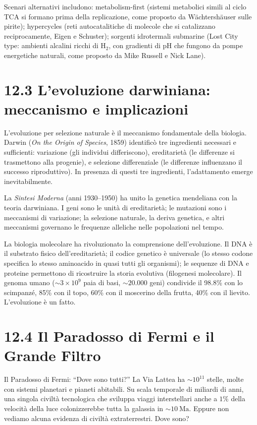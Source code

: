 \documentclass[11.5pt,a4paper,openany]{book}
\theoremstyle{remark}
\begin{document}
Scenari alternativi includono: metabolism-first (sistemi metabolici simili al ciclo TCA si formano prima della replicazione, come proposto da Wächtershäuser sulle pirite); hypercycles (reti autocatalitiche di molecole che si catalizzano reciprocamente, Eigen e Schuster); sorgenti idrotermali submarine (Lost City type: ambienti alcalini ricchi di H$_2$, con gradienti di pH che fungono da pompe energetiche naturali, come proposto da Mike Russell e Nick Lane).

\section{12.3 L'evoluzione darwiniana: meccanismo e implicazioni}

L'evoluzione per selezione naturale è il meccanismo fondamentale della biologia. Darwin (\textit{On the Origin of Species}, 1859) identificò tre ingredienti necessari e sufficienti: variazione (gli individui differiscono), ereditarietà (le differenze si trasmettono alla progenie), e selezione differenziale (le differenze influenzano il successo riproduttivo). In presenza di questi tre ingredienti, l'adattamento emerge inevitabilmente.

La \textit{Sintesi Moderna} (anni 1930--1950) ha unito la genetica mendeliana con la teoria darwiniana. I geni sono le unità di ereditarietà; le mutazioni sono i meccanismi di variazione; la selezione naturale, la deriva genetica, e altri meccanismi governano le frequenze alleliche nelle popolazioni nel tempo.

La biologia molecolare ha rivoluzionato la comprensione dell'evoluzione. Il DNA è il substrato fisico dell'ereditarietà; il codice genetico è universale (lo stesso codone specifica lo stesso aminoacido in quasi tutti gli organismi); le sequenze di DNA e proteine permettono di ricostruire la storia evolutiva (filogenesi molecolare). Il genoma umano ($\sim 3 \times 10^9$ paia di basi, $\sim 20.000$ geni) condivide il 98.8\% con lo scimpanzé, 85\% con il topo, 60\% con il moscerino della frutta, 40\% con il lievito. L'evoluzione è un fatto.

\section{12.4 Il Paradosso di Fermi e il Grande Filtro}

Il Paradosso di Fermi: ``Dove sono tutti?'' La Via Lattea ha $\sim 10^{11}$ stelle, molte con sistemi planetari e pianeti abitabili. Su scala temporale di miliardi di anni, una singola civiltà tecnologica che sviluppa viaggi interstellari anche a $1\%$ della velocità della luce colonizzerebbe tutta la galassia in $\sim 10\ \text{Ma}$. Eppure non vediamo alcuna evidenza di civiltà extraterrestri. Dove sono?
\end{document}

